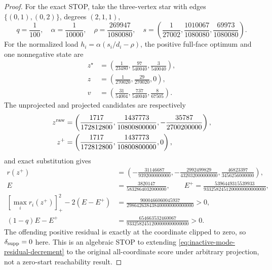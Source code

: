 \begin{proof}
For the exact STOP, take the three-vertex star with edges
$\{(0,1),(0,2)\}$, degrees $(2,1,1)$,
\begin{equation*}
 q=\frac1{100},\quad \alpha=\frac1{10000},\quad
 \rho=\frac{269947}{1080080},\quad
 s=\left(\frac1{27002},\frac{1010067}{1080080},
          \frac{69973}{1080080}\right).
\end{equation*}
For the normalized load $h_i=\alpha(s_i/d_i-\rho)$, the positive full-face
optimum and one nonnegative state are
\begin{align*}
 z^\star&=\left(\frac1{23480},\frac{97}{540040},
                  \frac3{540040}\right),\\
 z&=\left(\frac1{270020},\frac{29}{270020},0\right),\\
 v&=\left(\frac{31}{54004},\frac{737}{540040},
           \frac8{67505}\right).
\end{align*}
The unprojected and projected candidates are respectively
\begin{align*}
 z^{\rm raw}
 &=\left(\frac{1717}{172812800},
          \frac{1437773}{10800800000},
          -\frac{35787}{2700200000}\right),\\
 z^+
 &=\left(\frac{1717}{172812800},
          \frac{1437773}{10800800000},0\right),
\end{align*}
and exact substitution gives
\begin{align*}
 r(z^+)&=\left(-\frac{31146687}{9392000000000},
 -\frac{2992499829}{432032000000000},
 \frac{46823397}{3456256000000}\right),\\
 E&=\frac{3820147}{5832864032000000},\qquad
 E^+=\frac{5396449315539933}{9332582451200000000000000},\\
 \left[\max_i r_i(z^+)\right]_+^2-2(E-E^+)
 &=\frac{9000466060045937}{298642638438400000000000000}>0,\\
 (1-q)E-E^+
 &=\frac{654663532460067}{9332582451200000000000000}>0.
\end{align*}
The offending positive residual is exactly at the coordinate clipped to
zero, so $\delta_{\rm supp}=0$ here.  This is an algebraic STOP to extending
\cref{eq:inactive-mode-residual-decrement} to the original all-coordinate
score under arbitrary projection, not a zero-start reachability result.
\end{proof}

